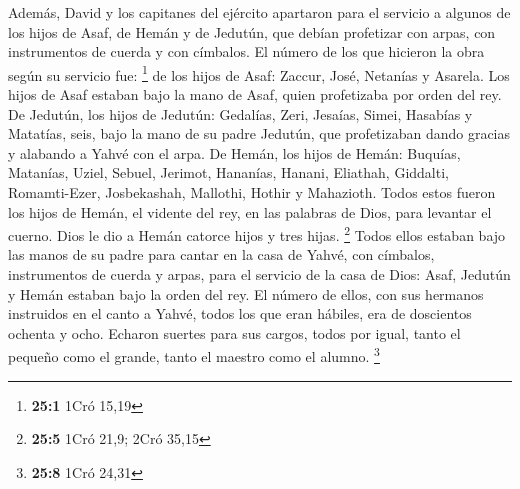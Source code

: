  Además, David y los capitanes del ejército apartaron para
el servicio a algunos de los hijos de Asaf, de Hemán y de Jedutún, que
debían profetizar con arpas, con instrumentos de cuerda y con címbalos.
El número de los que hicieron la obra según su servicio fue: \footnote{\textbf{25:1}
  1Cró 15,19}  de los hijos de Asaf: Zaccur, José,
Netanías y Asarela. Los hijos de Asaf estaban bajo la mano de Asaf,
quien profetizaba por orden del rey.  De Jedutún, los
hijos de Jedutún: Gedalías, Zeri, Jesaías, Simei, Hasabías y Matatías,
seis, bajo la mano de su padre Jedutún, que profetizaban dando gracias y
alabando a Yahvé con el arpa.  De Hemán, los hijos de
Hemán: Buquías, Matanías, Uziel, Sebuel, Jerimot, Hananías, Hanani,
Eliathah, Giddalti, Romamti-Ezer, Josbekashah, Mallothi, Hothir y
Mahazioth.  Todos estos fueron los hijos de Hemán, el
vidente del rey, en las palabras de Dios, para levantar el cuerno. Dios
le dio a Hemán catorce hijos y tres hijas. \footnote{\textbf{25:5} 1Cró
  21,9; 2Cró 35,15}  Todos ellos estaban bajo las manos de
su padre para cantar en la casa de Yahvé, con címbalos, instrumentos de
cuerda y arpas, para el servicio de la casa de Dios: Asaf, Jedutún y
Hemán estaban bajo la orden del rey.  El número de ellos,
con sus hermanos instruidos en el canto a Yahvé, todos los que eran
hábiles, era de doscientos ochenta y ocho.  Echaron
suertes para sus cargos, todos por igual, tanto el pequeño como el
grande, tanto el maestro como el alumno. \footnote{\textbf{25:8} 1Cró
  24,31}

